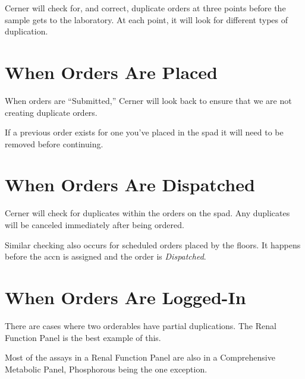 
\noindent
Cerner will check for, and correct, duplicate orders at three points before the sample gets to the laboratory. At each point, it will look for different types of duplication.

\begin{quote}
\end{quote}

\section{When Orders Are Placed}
When orders are ``Submitted,'' Cerner will look back to ensure that we are not creating duplicate orders.

If a previous order exists for one you've placed in the \gls{spad} it will need to be removed before continuing.

\section{When Orders Are Dispatched}
Cerner will check for duplicates within the orders on the \gls{spad}. Any duplicates will be canceled immediately after being ordered.

Similar checking also occurs for scheduled orders placed by the floors. It happens before the \gls{accn} is assigned and the order is \textit{Dispatched}.

\section{When Orders Are Logged-In}
There are cases where two orderables have partial duplications. The Renal Function Panel is the best example of this.

Most of the assays in a Renal Function Panel are also in a Comprehensive Metabolic Panel, Phosphorous being the one exception.

